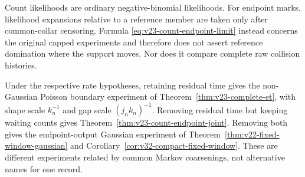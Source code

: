 \begin{remark}
Count likelihoods are ordinary negative-binomial likelihoods.  For endpoint
marks, likelihood expansions relative to a reference member are taken only
after common-collar censoring.  Formula
\eqref{eq:v23-count-endpoint-limit} instead concerns the original capped
experiments and therefore does not assert reference domination where the
support moves.  Nor does it compare complete raw collision histories.
\end{remark}

\begin{remark}
\label{rem:v23-three-level-information}
Under the respective rate hypotheses, retaining residual time gives the
non-Gaussian Poisson boundary experiment of
Theorem~\ref{thm:v23-complete-et}, with shape scale \(k_n^{-1}\) and gap
scale \((j_nk_n)^{-1}\).  Removing residual time but keeping waiting counts
gives Theorem~\ref{thm:v23-count-endpoint-joint}.  Removing both gives the
endpoint-output Gaussian experiment of
Theorem~\ref{thm:v22-fixed-window-gaussian} and
Corollary~\ref{cor:v32-compact-fixed-window}.  These are different experiments
related by common Markov coarsenings, not alternative names for one record.
\end{remark}